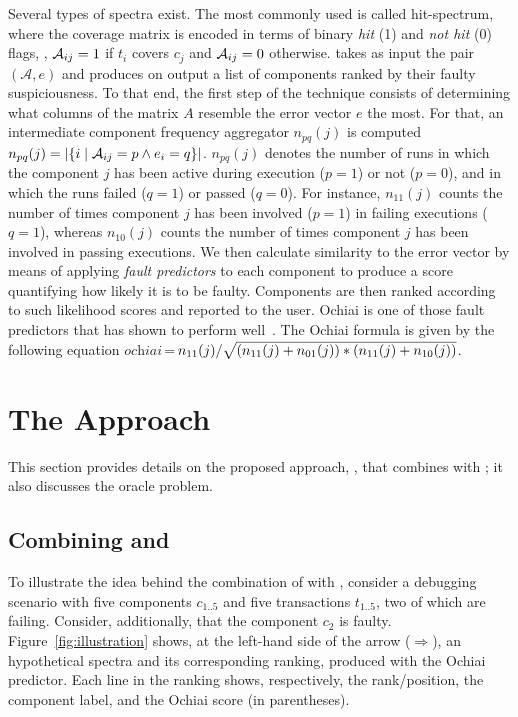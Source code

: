 \documentclass{article}
\begin{document}
Several types of spectra exist.  The most commonly used is called
hit-spectrum, where the coverage matrix is encoded in terms of binary
\emph{hit} (1) and \emph{not hit} (0) flags, \ie{}, $\mathcal{A}_{ij} = 1$ if
$t_i$ covers $c_j$ and $\mathcal{A}_{ij} = 0$ otherwise.  \sfl{} takes as input
the pair $(\mathcal{A},e)$ and produces on output a list of components
ranked by their faulty suspiciousness. To that end, the first step of
the technique consists of determining what columns of the matrix $A$
resemble the error vector $e$ the most.  For that, an intermediate
component frequency aggregator $n_{pq}(j)$ is computed $n_{pq}(j) =
|\{i\mid \mathcal{A}_{ij}=p \wedge e_i=q\}|$. $n_{pq}(j)$ denotes the number of
runs in which the component $j$ has been active during execution ($p =
1$) or not ($p=0$), and in which the runs failed ($q = 1$) or passed
($q = 0$).  For instance, $n_{11}(j)$ counts the number of times
component $j$ has been involved ($p = 1$) in failing executions ($q =
1$), whereas $n_{10}(j)$ counts the number of times component $j$ has
been involved in passing executions. We then calculate similarity to
the error vector by means of applying \emph{fault predictors} to each
component to produce a score quantifying how likely it is to be
faulty.  Components are then ranked according to such likelihood
scores and reported to the user. Ochiai is one of those fault
predictors that has shown to perform
well~\cite{7390282,Pearson:2017:EIF:3097368.3097441}. The Ochiai
formula is given by the following equation
$\textit{ochiai}\,$=$\,n_{11}(j)/\sqrt{(n_{11}(j)+n_{01}(j)) * (n_{11}(j)+n_{10}(j))}$.

\section{The \comb{} Approach}
\label{sec:approach}

This section provides details on the proposed approach, \combpar{}, that combines
\ds{} with \sfl{}; it also discusses the oracle problem.

\subsection{Combining \ds{} and \sfl{}}
\label{sec:comb}

To illustrate the idea behind the combination of \sfl{} with \ds{}, consider a
debugging scenario with five components $c_{1..5}$ and five
transactions $t_{1..5}$, two of which are failing. Consider,
additionally, that the component $c_2$ is faulty.
Figure~\ref{fig:illustration} shows, at the left-hand side of the
arrow ($\Rightarrow$), an hypothetical spectra and its corresponding
ranking, produced with the Ochiai predictor. Each line in the ranking
shows, respectively, the rank/position, the component label, and the
Ochiai score (in parentheses).
\end{document}
